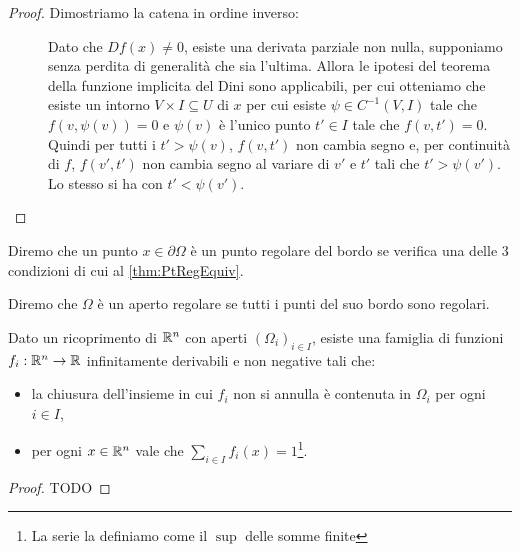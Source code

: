 \begin{proof}
	Dimostriamo la catena in ordine inverso:
	\begin{description}
		\item [] Dato che $Df(x)\neq 0$, esiste una derivata parziale non nulla, supponiamo senza perdita di
			generalità che sia l'ultima. Allora le ipotesi del teorema della funzione implicita del Dini sono applicabili, per cui
			otteniamo che esiste un intorno $V\times I\subseteq U$ di $x$ per cui esiste $\psi\in C^{-1}(V,I)$ tale che $f(v,\psi(v))=0$
			e $\psi(v)$ è l'unico punto $t'\in I$ tale che $f(v,t')=0$. Quindi per tutti i $t'>\psi(v)$, $f(v,t')$ non cambia segno e,
			per continuità di $f$, $f(v',t')$ non cambia segno al variare di $v'$ e $t'$ tali che $t'>\psi(v')$. Lo stesso si ha con 
			$t'<\psi(v')$. 
		\item []
		\item []
	\end{description}

\end{proof}


\begin{definition}
	Diremo che un punto $x\in \partial \Omega$ è un punto regolare del bordo se verifica una delle $3$ condizioni di cui
	al \cref{thm:PtRegEquiv}.
\end{definition}

\begin{definition}
	Diremo che $\Omega$ è un aperto regolare se tutti i punti del suo bordo sono regolari.
\end{definition}

\begin{theorem}\label{thm:PartizioneUnita}
	Dato un ricoprimento di $\mathbb R^n$ con aperti $(\Omega_i)_{i\in I}$, esiste una famiglia di funzioni $f_i:\mathbb R^n\to\mathbb R$ infinitamente derivabili e non negative tali che:
	\begin{itemize}
		\item la chiusura dell'insieme in cui $f_i$ non si annulla è contenuta in $\Omega_i$ per ogni $i\in I$,
		\item per ogni $x\in\mathbb R^n$ vale che $\sum_{i\in I} f_i(x)=1$\footnote{La serie la definiamo come il $\sup$ delle somme finite}.
	\end{itemize}
\end{theorem}
\begin{proof}
	TODO
\end{proof}

